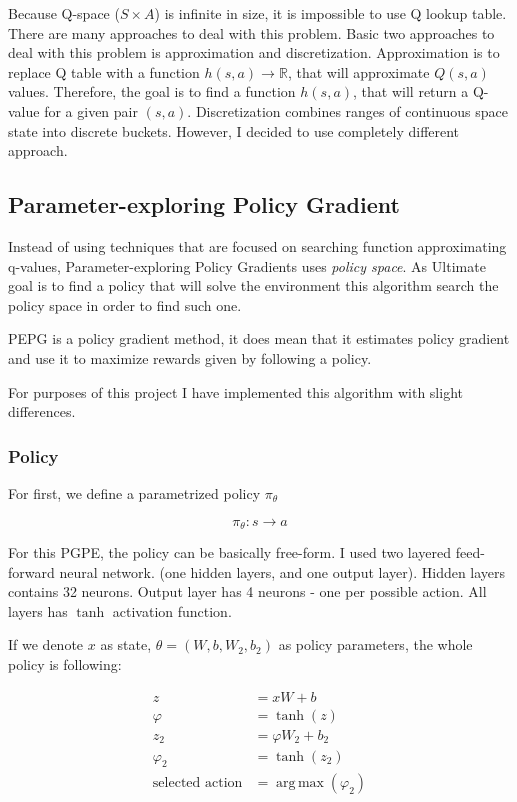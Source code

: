 \documentclass[12pt]{article}
\DeclareMathOperator*{\argmax}{arg\,max}
\begin{document}
Because Q-space ($S \times A$) is infinite in size, it is impossible to use Q lookup table. There are many approaches to deal with this problem. Basic two approaches to deal with this problem is approximation and discretization. Approximation is to replace Q table with a function $h(s,a) \rightarrow \mathbb{R}$, that will approximate $Q(s, a)$ values. Therefore, the goal is to find a function $h(s, a)$, that will return a Q-value for a given pair $(s,a)$. 
Discretization combines ranges of continuous space state into discrete buckets. However, I decided to use completely different approach.

\subsection{Parameter-exploring Policy Gradient}
Instead of using techniques that are focused on searching function approximating q-values, Parameter-exploring Policy Gradients\cite{pgpe} uses \emph{policy space}. As Ultimate goal is to find a policy that will solve the environment this algorithm search the policy space in order to find such one.

PEPG is a policy gradient method, it does mean that it estimates policy gradient and use it to maximize rewards given by following a policy.

For purposes of this project I have implemented this algorithm with slight differences.

\subsubsection{Policy}

For first, we define a parametrized policy $\pi_\theta$

\begin{equation}
\pi_\theta: s \rightarrow a
\end{equation}

For this PGPE, the policy can be basically free-form. I used two layered feed-forward neural network. (one hidden layers, and one output layer).
Hidden layers contains 32 neurons. Output layer has 4 neurons - one per possible action. All layers has $\tanh$ activation function.

If we denote $x$ as state, $\theta = (W,b,W_2,b_2)$ as policy parameters, the whole policy is following:

\begin{equation}
\begin{aligned}
z &= xW + b \\
\varphi &= \tanh(z) \\
z_2 &= \varphi W_2 + b_2 \\
\varphi_2 &= \tanh(z_2) \\
\text{selected action} &= \argmax(\varphi_2)
\end{aligned}
\end{equation}
\end{document}
